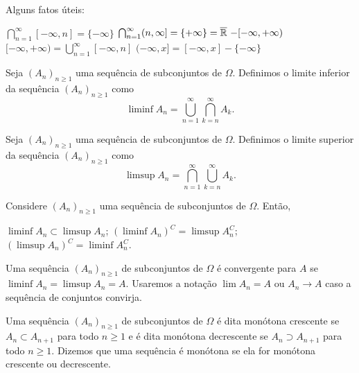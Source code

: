 \begin{theorem}
	Alguns fatos úteis:
	\begin{outline}[enumerate]
		\1 \(\bigcap_{n=1}^{\infty}[-\infty,n] = \{-\infty\}\)
		\1 \(\bigcap_{n=1}^{\infty}(n,\infty] = \{+\infty\} = \Ree - [-\infty, +\infty)\)
		\1 \([-\infty, +\infty) = \bigcup_{n=1}^{\infty}[-\infty, n]\)
		\1 \((-\infty,x] = [-\infty,x]-\{-\infty\} \)
	\end{outline}
\end{theorem}

\begin{definition}
	Seja $(A_n)_{n\geq 1}$ uma sequência de subconjuntos de $\Omega$. Definimos o limite inferior da sequência $(A_n)_{n\geq 1}$ como
	\[
	\liminf A_n = \bigcup_{n=1}^{\infty} \bigcap_{k=n}^{\infty} A_k.
	\]
\end{definition}

\begin{definition}
	Seja $(A_n)_{n\geq 1}$ uma sequência de subconjuntos de $\Omega$. Definimos o limite superior da sequência $(A_n)_{n\geq 1}$ como
	\[
	\limsup A_n = \bigcap_{n=1}^{\infty} \bigcup_{k=n}^{\infty} A_k.
	\]
\end{definition}

\begin{theorem}
	Considere $(A_n)_{n\geq 1}$ uma sequência de subconjuntos de $\Omega$. Então,
	\begin{outline}[enumerate]
		\1 $\liminf A_n \subset \limsup A_n$;
		\1 $(\liminf A_n)^C = \limsup A_n^C$;
		\1 $(\limsup A_n)^C = \liminf A_n^C$.
	\end{outline}
\end{theorem}

\begin{definition}
	Uma sequência $(A_n)_{n\geq 1}$ de subconjuntos de $\Omega$ é convergente para $A$ se $\liminf A_n = \limsup A_n = A$. Usaremos a notação $\lim A_n = A$ ou $A_n \to A$ caso a sequência de conjuntos convirja.
\end{definition}

\begin{definition}
	Uma sequência $(A_n)_{n\geq 1}$ de subconjuntos de $\Omega$ é dita monótona crescente se $A_n \subset A_{n+1}$ para todo $n \geq 1$ e é dita monótona decrescente se $A_n \supset A_{n+1}$ para todo $n \geq 1$. Dizemos que uma sequência é monótona se ela for monótona crescente ou decrescente.
\end{definition}

